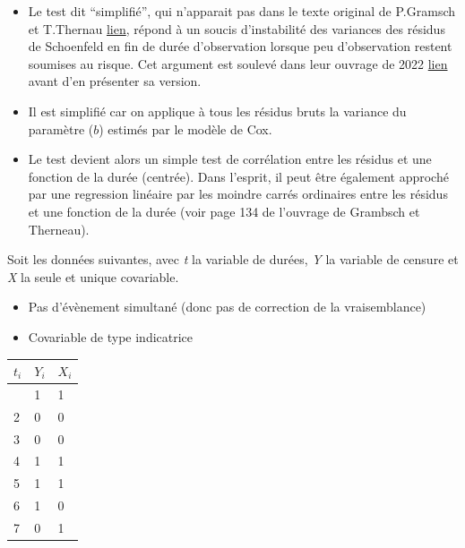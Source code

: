 \documentclass[
  12pt,
  letterpaper,
  DIV=11,
  numbers=noendperiod,
  onepage,
  openany]{scrreprt}
\providecommand{\tightlist}{%
  \setlength{\itemsep}{0pt}\setlength{\parskip}{0pt}}\usepackage{longtable,booktabs,array}
\begin{document}
\begin{itemize}
\tightlist
\item
  Le test dit ``simplifié'', qui n'apparait pas dans le texte original
  de P.Gramsch et T.Thernau
  \href{https://www.jstor.org/stable/2337123\#metadata_info_tab_contents}{lien},
  répond à un soucis d'instabilité des variances des résidus de
  Schoenfeld en fin de durée d'observation lorsque peu d'observation
  restent soumises au risque. Cet argument est soulevé dans leur ouvrage
  de 2022
  \href{https://link.springer.com/book/10.1007/978-1-4757-3294-8}{lien}
  avant d'en présenter sa version.
\item
  Il est simplifié car on applique à tous les résidus bruts la variance
  du paramètre (\(b\)) estimés par le modèle de Cox.
\item
  Le test devient alors un simple test de corrélation entre les résidus
  et une fonction de la durée (centrée). Dans l'esprit, il peut être
  également approché par une regression linéaire par les moindre carrés
  ordinaires entre les résidus et une fonction de la durée (voir page
  134 de l'ouvrage de Grambsch et Therneau).
\end{itemize}

Soit les données suivantes, avec \emph{t} la variable de durées,
\emph{Y} la variable de censure et \emph{X} la seule et unique
covariable.

\begin{itemize}
\tightlist
\item
  Pas d'évènement simultané (donc pas de correction de la vraisemblance)
\item
  Covariable de type indicatrice
\end{itemize}

\begin{longtable}[]{@{}lll@{}}
\toprule\noalign{}
\(t_i\) & \(Y_i\) & \(X_i\) \\
\midrule\noalign{}
\endhead
\bottomrule\noalign{}
\endlastfoot
1 & 1 & 1 \\
2 & 0 & 0 \\
3 & 0 & 0 \\
4 & 1 & 1 \\
5 & 1 & 1 \\
6 & 1 & 0 \\
7 & 0 & 1 \\
\end{longtable}
\end{document}
